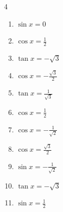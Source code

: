 \begin{multicols}{4}
\begin{enumerate}
  \item $\displaystyle \sin{x}  = 0$


  \item $\displaystyle \cos{x}  = \frac{1}{2}$


  \item $\displaystyle \tan{x}  = -\sqrt{3}$


  \item $\displaystyle \cos{x}  = -\frac{\sqrt{3}}{2}$


  \item $\displaystyle \tan{x}  = \frac{1}{\sqrt{3}}$


  \item $\displaystyle \cos{x}  = \frac{1}{2}$


  \item $\displaystyle \cos{x}  = -\frac{1}{\sqrt{2}}$


  \item $\displaystyle \cos{x}  = \frac{\sqrt{3}}{2}$


  \item $\displaystyle \sin{x}  = -\frac{1}{\sqrt{2}}$


  \item $\displaystyle \tan{x}  = -\sqrt{3}$


\columnbreak %

  \item $\displaystyle \sin{x}  = \frac{1}{2}$



\end{enumerate}
\end{multicols}
